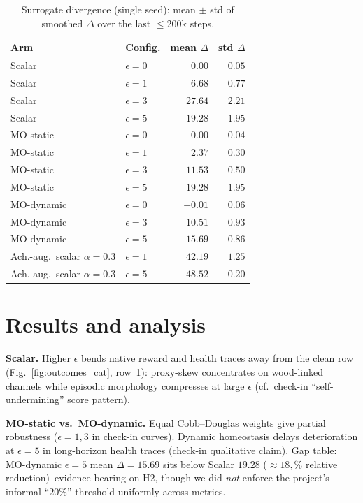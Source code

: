 \documentclass[10pt,twocolumn]{article}
\theoremstyle{definition}
\begin{document}
\begin{table}[t]
  \centering
  \footnotesize
  \caption{Surrogate divergence (single seed): mean \(\pm\) std of smoothed \(\Delta\) over the last \(\le\)200k steps.}
  \label{tab:gap}
  \begin{tabular}{@{}llrr@{}} \toprule
    Arm & Config. & mean \(\Delta\) & std \(\Delta\) \\\midrule
    Scalar & \(\epsilon{=}0\) & \(0.00\) & \(0.05\) \\
    Scalar & \(\epsilon{=}1\) & \(6.68\) & \(0.77\) \\
    Scalar & \(\epsilon{=}3\) & \(27.64\) & \(2.21\) \\
    Scalar & \(\epsilon{=}5\) & \(19.28\) & \(1.95\) \\\midrule
    MO-static & \(\epsilon{=}0\) & \(0.00\) & \(0.04\) \\
    MO-static & \(\epsilon{=}1\) & \(2.37\) & \(0.30\) \\
    MO-static & \(\epsilon{=}3\) & \(11.53\) & \(0.50\) \\
    MO-static & \(\epsilon{=}5\) & \(19.28\) & \(1.95\) \\\midrule
    MO-dynamic & \(\epsilon{=}0\) & \(-0.01\) & \(0.06\) \\
    MO-dynamic & \(\epsilon{=}3\) & \(10.51\) & \(0.93\) \\
    MO-dynamic & \(\epsilon{=}5\) & \(15.69\) & \(0.86\) \\\midrule
    Ach.-aug.\ scalar \(\alpha{=}0.3\) & \(\epsilon{=}1\) & \(42.19\) & \(1.25\) \\
    Ach.-aug.\ scalar \(\alpha{=}0.3\) & \(\epsilon{=}5\) & \(48.52\) & \(0.20\) \\\bottomrule
  \end{tabular}
\end{table}

\section{Results and analysis}
\textbf{Scalar.} Higher \(\epsilon\) bends native reward and health traces away from the clean row (Fig.~\ref{fig:outcomes_cat}, row~1): proxy-skew concentrates on wood-linked channels while episodic morphology compresses at large \(\epsilon\) (cf.\ check-in ``self-undermining'' score pattern).

\textbf{MO-static vs.\ MO-dynamic.} Equal Cobb--Douglas weights give partial robustness (\(\epsilon{=}1,3\) in check-in curves). Dynamic homeostasis delays deterioration at \(\epsilon{=}5\) in long-horizon health traces (check-in qualitative claim). Gap table: MO-dynamic \(\epsilon{=}5\) mean \(\Delta{=}15.69\) sits below Scalar \(19.28\) (\(\approx 18{,}\%\) relative reduction)--evidence bearing on H2, though we did \emph{not} enforce the project's informal ``\(20{\%}\)'' threshold uniformly across metrics.
\end{document}

